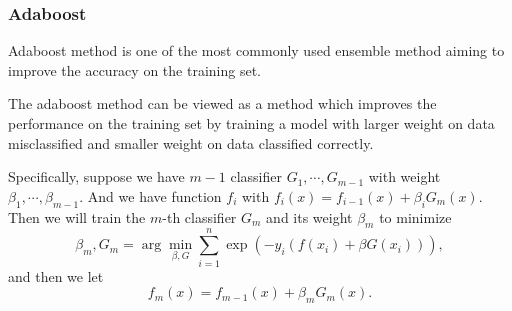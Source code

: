 \documentclass[english]{article}
\begin{document}
\subsubsection{Adaboost}
\par Adaboost method is one of the most commonly used ensemble method aiming to improve the accuracy on the training set.
\par The adaboost method can be viewed as a method which improves the performance on the training set by training a model with larger weight on data misclassified and smaller weight on data classified correctly.
\par Specifically, suppose we have $m-1$ classifier $G_{1}, \cdots, G_{m-1}$ with weight $\beta_{1}, \cdots, \beta_{m-1}$. And we have function $f_{i}$ with $f_{i}(x) = f_{i-1}(x) + \beta_{i}G_{m}(x)$. Then we will train the $m$-th classifier $G_{m}$ and its weight $\beta_{m}$ to minimize
\begin{equation}
	\beta_{m}, G_{m} = \arg\min_{\beta, G}\sum_{i=1}^{n}\exp(-y_{i}(f(x_{i}) + \beta G(x_{i}))),
\end{equation}
and then we let
\begin{equation}
	f_{m}(x) = f_{m-1}(x) + \beta_{m}G_{m}(x).
\end{equation}
\end{document}
